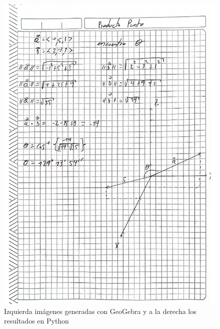 \documentclass{article}
\begin{document}
\begin{figure}[h!]
    \begin{minipage}{0.45\textwidth}
        \centering
        \includegraphics[width=\textwidth]{imgs/Actividad X julio amaya.pdf}
    \end{minipage}
    
    \caption{Izquierda imágenes generadas con GeoGebra y a la derecha los resultados en Python}
\end{figure}
\end{document}
